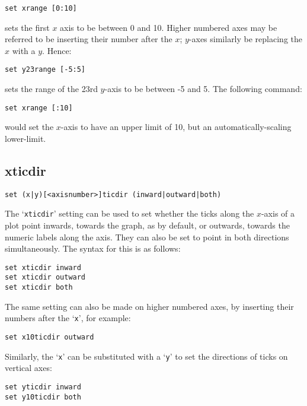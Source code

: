 \documentclass[a4paper,onecolumn,11pt]{book}
\begin{document}
\begin{verbatim}
set xrange [0:10]
\end{verbatim}

\noindent sets the first $x$ axis to be between 0 and 10.  Higher numbered axes may be
referred to be inserting their number after the $x$; $y$-axes similarly be
replacing the $x$ with a $y$.  Hence:

\begin{verbatim}
set y23range [-5:5]
\end{verbatim}

\noindent sets the range of the 23rd $y$-axis to be between -5 and 5.  The
following command:

\begin{verbatim}
set xrange [:10]
\end{verbatim}

\noindent would set the $x$-axis to have an upper limit of 10, but an
automatically-scaling lower-limit.

\subsection{xticdir}

\begin{verbatim}
set (x|y)[<axisnumber>]ticdir (inward|outward|both)
\end{verbatim}

The `{\tt xticdir}' setting can be used to set whether the ticks along the
$x$-axis of a plot point inwards, towards the graph, as by default, or outwards,
towards the numeric labels along the axis. They can also be set to point in both
directions simultaneously. The syntax for this is as follows:

\begin{verbatim}
set xticdir inward 
set xticdir outward 
set xticdir both
\end{verbatim}

The same setting can also be made on higher numbered axes, by inserting their
numbers after the `{\tt x}', for example:

\begin{verbatim}
set x10ticdir outward
\end{verbatim}

Similarly, the `{\tt x}' can be substituted with a `{\tt y}' to set the directions of ticks
on vertical axes:

\begin{verbatim}
set yticdir inward
set y10ticdir both
\end{verbatim}
\end{document}
